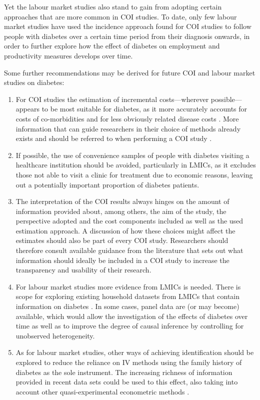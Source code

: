 Yet the labour market studies also stand to gain from adopting certain approaches that are more common in \ac{COI} studies. To date, only few labour market studies have used the incidence approach found for \ac{COI} studies to follow people with diabetes over a certain time period from their diagnosis onwards, in order to further explore how the effect of diabetes on employment and productivity measures develops over time.

Some further recommendations may be derived for future \ac{COI} and labour market studies on diabetes: 
\begin{enumerate}


\item	For \ac{COI} studies the estimation of incremental costs---wherever possible---appears to be most suitable for diabetes, as it more accurately accounts for costs of co-morbidities  and for less obviously related disease costs \parencite{Honeycutt2009a,Tunceli2010c}. More information that can guide researchers in their choice of methods already exists and should be referred to when performing a \ac{COI} study \parencite{Akobundu2006}.

\item	If possible, the use of convenience samples of people with diabetes visiting a healthcare institution should be avoided, particularly in \acp{LMIC}, as it excludes those not able to visit a clinic for treatment due to economic reasons, leaving out a potentially important proportion of diabetes patients.

\item	The interpretation of the \ac{COI} results always hinges on the amount of information provided about, among others, the aim of the study, the perspective adopted and the cost components included as well as the used estimation approach. A discussion of how these choices might affect the estimates should also be part of every \ac{COI} study. Researchers should therefore consult available guidance from the literature that sets out what information should ideally be included in a \ac{COI} study \parencite{Larg2011} to increase the transparency and usability of their research. 

\item	For labour market studies more evidence from \acp{LMIC} is needed. There is scope for exploring existing household datasets from \acp{LMIC} that contain information on diabetes \parencite{Seuring2014}. In some cases, panel data are (or may become) available, which would allow the investigation of the effects of diabetes over time as well as to improve the degree of causal inference by controlling for unobserved heterogeneity.

\item	As for labour market studies, other ways of achieving identification should be explored to reduce the reliance on \ac{IV} methods using the family history of diabetes as the sole instrument. The increasing richness of information provided in recent data sets could be used to this effect, also taking into account other quasi-experimental econometric methods \parencite{Craig2012}.
\end{enumerate}

